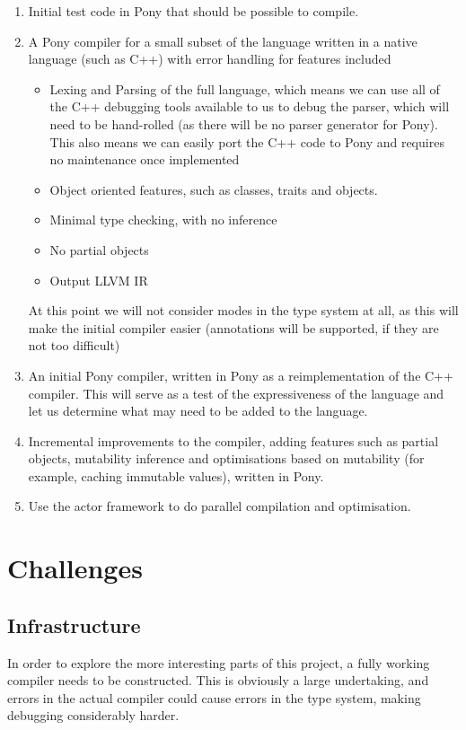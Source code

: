 \documentclass[11pt,a4paper]{report}
\begin{document}
\begin{enumerate}
	\item Initial test code in Pony that should be possible to compile.
	\item A Pony compiler for a small subset of the language written in a native language (such as C++) with error handling for features included
		\begin{itemize}
			\item Lexing and Parsing of the full language, which means we can use all of the C++ debugging tools available to us to debug the parser, which will need to be hand-rolled (as there will be no parser generator for Pony).
				This also means we can easily port the C++ code to Pony and requires no maintenance once implemented
			\item Object oriented features, such as classes, traits and objects.
			\item Minimal type checking, with no inference
			\item No partial objects
			\item Output LLVM IR
		\end{itemize}
	At this point we will not consider modes in the type system at all, as this will make the initial compiler easier (annotations will be supported, if they are not too difficult)
	\item An initial Pony compiler, written in Pony as a reimplementation of the C++ compiler.
		This will serve as a test of the expressiveness of the language and let us determine what may need to be added to the language.
	\item Incremental improvements to the compiler, adding features such as partial objects, mutability inference and optimisations based on mutability (for example, caching immutable values), written in Pony.
    	\item Use the actor framework to do parallel compilation and optimisation.
\end{enumerate}

\section{Challenges}

\subsection{Infrastructure}

In order to explore the more interesting parts of this project, a fully working compiler needs to be constructed.
This is obviously a large undertaking, and errors in the actual compiler could cause errors in the type system, making debugging considerably harder.
\end{document}
